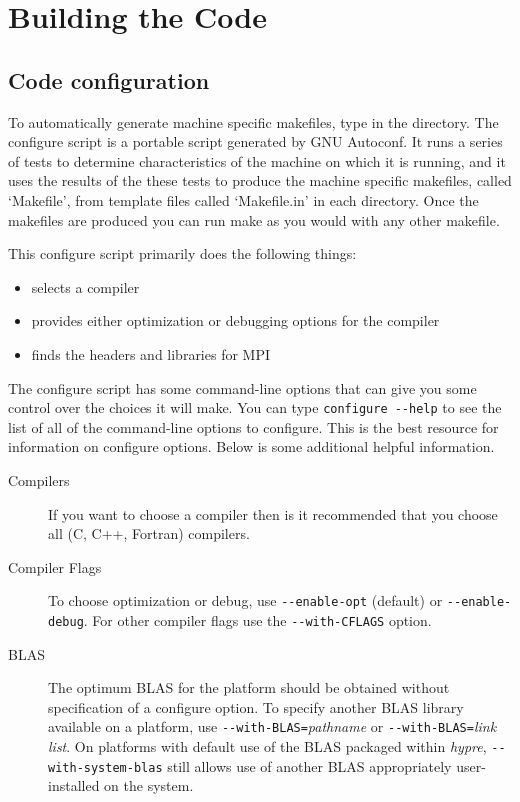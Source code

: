 \chapter{Building the Code}
\section{Code configuration}

To automatically generate machine specific makefiles, type
 in the  directory.  The configure
script is a portable script generated by GNU Autoconf.  It runs a
series of tests to determine characteristics of the machine on which
it is running, and it uses the results of the these tests to produce
the machine specific makefiles, called `Makefile', from template files
called `Makefile.in' in each directory.  Once the makefiles are
produced you can run make as you would with any other makefile.

This configure script primarily does the following things:
\begin{itemize}
\item selects a compiler
\item provides either optimization or debugging options for the compiler
\item finds the headers and libraries for MPI
\end{itemize}

The configure script has some command-line options that can give you
some control over the choices it will make.  You can type
\verb+configure --help+
to see the list of all of the command-line options to configure. This is
the best resource for information on configure options.  Below is some
additional helpful information.


\begin{description}

\item[Compilers] If you want to choose a compiler then is it recommended
that you choose all (C, C++, Fortran) compilers.

\item[Compiler Flags] To choose optimization or debug, use
\verb+--enable-opt+ (default) or \verb+--enable-debug+.
For other compiler flags use the \verb+--with-CFLAGS+ option.  

\item[BLAS] The optimum BLAS for the platform should be obtained
without specification of a configure option.
To specify another BLAS library available on a
platform, use \verb+--with-BLAS=+{\itshape pathname} or
\verb+--with-BLAS=+{\itshape link list}.  On platforms with
default use of the BLAS packaged within {\slshape hypre},
\verb+--with-system-blas+ still allows use
of another BLAS appropriately user-installed on the system.

\end{description}

